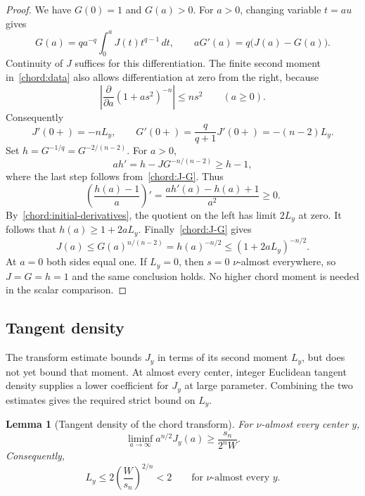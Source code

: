 \documentclass[11pt]{article}
\numberwithin{equation}{section}
\newtheorem{lemma}[theorem]{Lemma}
\theoremstyle{definition}
\theoremstyle{remark}
\begin{document}
\begin{proof}
We have $G(0)=1$ and $G(a)>0$. For $a>0$, changing variable
$t=au$ gives
\[
 G(a)=q a^{-q}\int_0^a J(t)t^{q-1}\,d t,
 \qquad aG'(a)=q\bigl(J(a)-G(a)\bigr).
\]
Continuity of $J$ suffices for this differentiation. The finite
second moment in~\eqref{chord:data} also allows differentiation
at zero from the right, because
\[
 \left|\frac{\partial}{\partial a}(1+as^2)^{-n}\right|
                 \le ns^2\qquad(a\ge0).
\]
Consequently
\begin{equation}\label{chord:initial-derivatives}
 J'(0+)=-nL_y,
 \qquad G'(0+)=\frac{q}{q+1}J'(0+)=-(n-2)L_y.
\end{equation}
Set $h=G^{-1/q}=G^{-2/(n-2)}$. For $a>0$,
\[
 ah'=h-JG^{-n/(n-2)}\ge h-1,
\]
where the last step follows from~\eqref{chord:J-G}. Thus
\[
 \left(\frac{h(a)-1}{a}\right)'
       =\frac{ah'(a)-h(a)+1}{a^2}\ge0.
\]
By~\eqref{chord:initial-derivatives}, the quotient on the left
has limit $2L_y$ at zero. It follows that
$h(a)\ge1+2aL_y$. Finally~\eqref{chord:J-G} gives
\[
 J(a)\le G(a)^{n/(n-2)}=h(a)^{-n/2}
                          \le(1+2aL_y)^{-n/2}.
\]
At $a=0$ both sides equal one. If $L_y=0$, then $s=0$
$\nu$-almost everywhere, so $J=G=h=1$ and the same conclusion
holds. No higher chord moment is needed in the scalar comparison.
\end{proof}

\subsection{Tangent density}

The transform estimate bounds $J_y$ in terms of its second moment
$L_y$, but does not yet bound that moment. At almost every center,
integer Euclidean tangent density supplies a lower coefficient for
$J_y$ at large parameter. Combining the two estimates gives the
required strict bound on $L_y$.

\begin{lemma}[Tangent density of the chord transform]\label{lem:chord-density}
For $\nu$-almost every center $y$,
\begin{equation}\label{chord:transform-density}
 \liminf_{a\to\infty}a^{n/2}J_y(a)
                         \ge\frac{s_n}{2^nW}.
\end{equation}
Consequently,
\begin{equation}\label{eq:chord-upper}
 L_y\le2\left(\frac{W}{s_n}\right)^{2/n}<2
                    \qquad\text{for $\nu$-almost every }y.
\end{equation}
\end{lemma}
\end{document}
